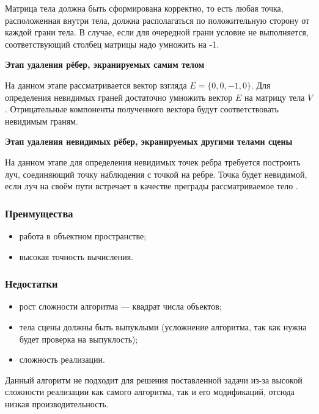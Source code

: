 Матрица тела должна быть сформирована корректно, то есть любая точка, расположенная внутри тела, должна располагаться по положительную сторону от каждой грани тела. В случае, если для очередной грани условие не выполняется, соответствующий столбец матрицы надо умножить на -1. 

\textbf{Этап удаления рёбер, экранируемых самим телом}

На данном этапе рассматривается вектор взгляда $E=\{0, 0,-1, 0\}$.
Для определения невидимых граней достаточно умножить вектор $E$ на матрицу тела $V$. Отрицательные компоненты полученного вектора будут соответствовать невидимым граням.

\textbf{Этап удаления невидимых рёбер, экранируемых другими телами сцены}

На данном этапе для определения невидимых точек ребра требуется построить луч, соединяющий точку наблюдения с точкой на ребре. Точка будет невидимой, если луч на своём пути встречает в качестве преграды рассматриваемое тело \cite{roberts}.

\subsubsection*{Преимущества}
\begin{itemize}
	\item работа в объектном пространстве;
	\item высокая точность вычисления.
\end{itemize}

\subsubsection*{Недостатки}
\begin{itemize}
	\item рост сложности алгоритма --- квадрат числа объектов;
	\item тела сцены должны быть выпуклыми (усложнение алгоритма, так как нужна будет проверка на выпуклость);
	\item сложность реализации.
\end{itemize}

Данный алгоритм не подходит для решения поставленной задачи из-за высокой сложности реализации как самого алгоритма, так и его модификаций, отсюда низкая производительность.



